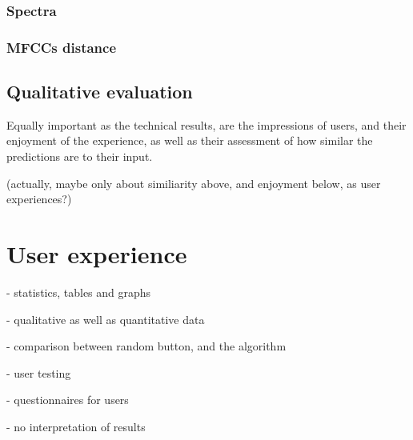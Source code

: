 \subsubsection{Spectra}

\subsubsection{MFCCs distance}

\subsection{Qualitative evaluation}

Equally important as the technical results, are the impressions of
users, and their enjoyment of the experience, as well as their
assessment of how similar the predictions are to their input.

(actually, maybe only about similiarity above, and enjoyment below, as
user experiences?)

\section{User experience}

- statistics, tables and graphs

- qualitative as well as quantitative data

- comparison between random button, and the algorithm

- user testing

- questionnaires for users

- no interpretation of results

